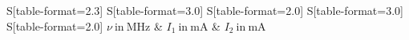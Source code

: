\begin{table}
    \centering
    \caption{Stromstärke $I_1,I_2$ beim Auftreten des Maximums für verschiedene Anregungsfrequenzen $\nu$}
    \label{tab:Werte}
    \begin{tabular}{
	S[table-format=2.3]
	S[table-format=3.0]
	S[table-format=2.0]
	S[table-format=3.0]
	S[table-format=2.0]
	}
	\toprule
	{$\nu \ \mathrm{in} \ \si{\mega\hertz}$}		& {$I_1 \ \mathrm{in} \ \si{\milli\ampere}$}		& 
	{$I_2 \ \mathrm{in} \ \si{\milli\ampere}$}		\\ 
	\midrule
    
    \bottomrule
    \end{tabular}
    \end{table}
